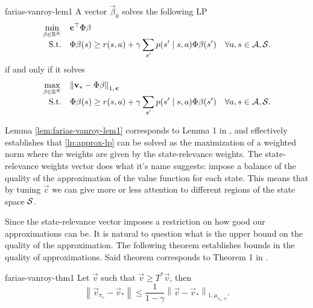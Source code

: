 \begin{lemma}{}{farias-vanroy-lem1}
    A vector $\vec{\beta}_0$ solves the following LP
    \[
    \begin{array}{rl@{}ll}
        \displaystyle \min_{\vec{\beta} \in \R^{K}} & \vec{c}^{\top} \Phi \vec{\beta} \\
        \text{S.t.} & \displaystyle \Phi \vec{\beta} (s) \geq r(s, a) + \gamma \sum_{s'} p(s' \mid s, a) \Phi \vec{\beta}(s') & \quad \forall a, s \in \Actions, \States . \\
    \end{array}
    \]
    if and only if it solves
    \[
    \begin{array}{rl@{}ll}
        \displaystyle \max_{\vec{\beta} \in \R^{K}} & \left\| \vec{v}_* - \Phi \vec{\beta} \right\|_{1, \, \vec{c}} \\
        \text{S.t.} & \displaystyle \Phi \vec{\beta} (s) \geq r(s, a) + \gamma \sum_{s'} p(s' \mid s, a) \Phi \vec{\beta}(s') & \quad \forall a, s \in \Actions, \States . \\
    \end{array}
    \]
\end{lemma}

Lemma \ref{lem:farias-vanroy-lem1} corresponds to Lemma 1 in
\Cite[pg.~853]{farias2003LP2ADP}, and effectively establishes that
\eqref{lp:approx-lp} can be solved as the maximization of a weighted norm where
the weights are given by the state-relevance weights. The state-relevance
weights vector does what it's name suggests: impose a balance of the quality of
the approximation of the value function for each state. This means that by
tuning $\vec{c}$ we can give more or less attention to different regions of the
state space $\mathcal{S}$.

Since the state-relevance vector imposes a restriction on how good our
approximations can be. It is natural to question what is the upper bound on the
quality of the approximation. The following theorem establishes bounds in the
quality of approximations. Said theorem corresponds to Theorem 1 in
\Cite[pg.~853]{farias2003LP2ADP}.

\begin{thrm}{}{farias-vanroy-thm1}
    Let $\vec{v}$ such that $\vec{v} \geq T^{*} \vec{v}$, then
    \[
       \left\| \vec{v}_{\pi_v} - \vec{v}_* \right\| \leq \frac{1}{1 - \gamma} \left\| \vec{v}  - \vec{v}_* \right\|_{1, \mu_{\pi_v, \, \sigma}}.
    \]
\end{thrm}

